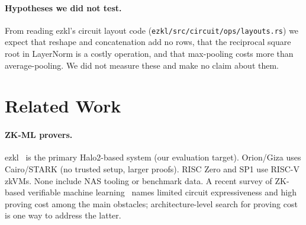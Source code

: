 \documentclass[10pt]{article}
\begin{document}
\paragraph{Hypotheses we did not test.}
From reading ezkl's circuit layout code (\texttt{ezkl/src/circuit/ops/layouts.rs}) we expect
that reshape and concatenation add no rows, that the reciprocal square root in LayerNorm is
a costly operation, and that max-pooling costs more than average-pooling.  We did not
measure these and make no claim about them.





\section{Related Work}
\label{sec:related}

\paragraph{ZK-ML provers.}
ezkl~\citep{ezkl2022} is the primary Halo2-based system (our
evaluation target).  Orion/Giza uses Cairo/STARK (no trusted setup, larger
proofs).  RISC Zero and SP1 use RISC-V zkVMs.  None include NAS tooling or
benchmark data.  A recent survey of ZK-based verifiable machine
learning~\citep{peng2025zkmlsurvey} names limited circuit expressiveness and
high proving cost among the main obstacles; architecture-level search for
proving cost is one way to address the latter.
\end{document}
